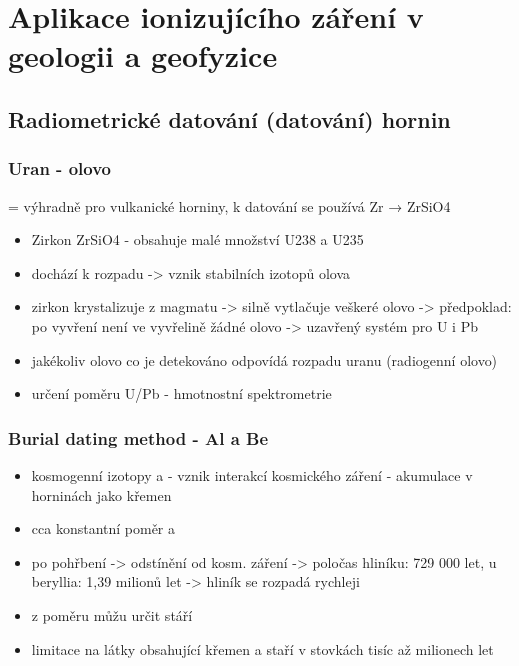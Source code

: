 \newpage
\section{Aplikace ionizujícího záření v geologii a geofyzice}


\subsection{Radiometrické datování (datování) hornin}

\subsubsection{Uran - olovo}
= výhradně pro vulkanické horniny, k datování se používá Zr → ZrSiO4
\begin{itemize}
    \item Zirkon ZrSiO4 - obsahuje malé množství U238 a U235
    \item dochází k rozpadu -> vznik stabilních izotopů olova
    \item zirkon krystalizuje z magmatu -> silně vytlačuje veškeré olovo -> předpoklad: po vyvření není ve vyvřelině žádné olovo -> uzavřený systém pro U i Pb
    
    \item jakékoliv olovo co je detekováno odpovídá rozpadu uranu (radiogenní olovo)
    \item určení poměru U/Pb - hmotnostní spektrometrie 
\end{itemize}

\subsubsection{Burial dating method - Al a Be}
\begin{itemize}
    \item kosmogenní izotopy  a  - vznik interakcí kosmického záření - akumulace v horninách jako křemen
    \item cca konstantní poměr  a  
    \item po pohřbení -> odstínění od kosm. záření -> poločas hliníku: 729 000 let, u beryllia: 1,39 milionů let -> hliník se rozpadá rychleji 
    \item z poměru můžu určit stáří
    \item limitace na látky obsahující křemen a staří v stovkách tisíc až milionech let
\end{itemize}

